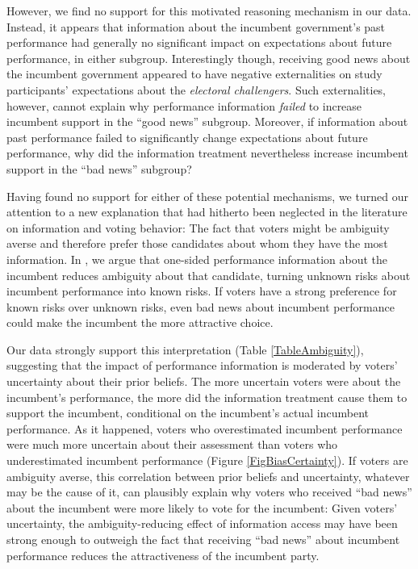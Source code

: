 \documentclass[11pt]{article}
\begin{document}
However, we find no support for this motivated reasoning mechanism in our data. Instead, it appears that information about the incumbent government's past performance had generally no significant impact on expectations about future performance, in either subgroup. Interestingly though, receiving good news about the incumbent government appeared to have negative externalities on study participants' expectations about the \emph{electoral challengers}. Such externalities, however, cannot explain why performance information \emph{failed} to increase incumbent support in the ``good news'' subgroup. Moreover, if information about past performance failed to significantly change expectations about future performance, why did the information treatment nevertheless increase incumbent support in the ``bad news'' subgroup? 

Having found no support for either of these potential mechanisms, we turned our attention to a new explanation that had hitherto been neglected in the literature on information and voting behavior: The fact that voters might be ambiguity averse and therefore prefer those candidates about whom they have the most information. In \citep{LierlHolmlundAmbiguity}, we argue that one-sided performance information about the incumbent reduces ambiguity about that candidate, turning unknown risks about incumbent performance into known risks. If voters have a strong preference for known risks over unknown risks, even bad news about incumbent performance could make the incumbent the more attractive choice. 

Our data strongly support this interpretation (Table \ref{TableAmbiguity}), suggesting that the impact of performance information is moderated by voters' uncertainty about their prior beliefs. The more uncertain voters were about the incumbent's performance, the more did the information treatment cause them to support the incumbent, conditional on the incumbent's actual incumbent performance. As it happened, voters who overestimated incumbent performance were much more uncertain about their assessment than voters who underestimated incumbent performance (Figure \ref{FigBiasCertainty}). If voters are ambiguity averse, this correlation between prior beliefs and uncertainty, whatever may be the cause of it, can plausibly explain why voters who received ``bad news'' about the incumbent were more likely to vote for the incumbent: Given voters' uncertainty, the ambiguity-reducing effect of information access may have been strong enough to outweigh the fact that receiving ``bad news'' about incumbent performance reduces the attractiveness of the incumbent party.  
\end{document}
